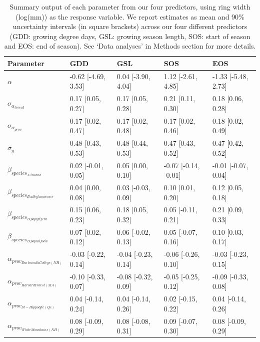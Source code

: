 \begin{table}[ht]
\centering
\caption{Summary output of each parameter from our four predictors, using ring width (log(mm)) as the response variable. We report estimates as mean and 90\% uncertainty intervals (in square brackets) across our four different predictors (GDD: growing degree days, GSL: growing season length, SOS: start of season and EOS: end of season). See `Data analyses' in Methods section for more details.} 
\label{tab:tab_all}
\begin{tabular}{lllll}
  \hline
Parameter & GDD & GSL & SOS & EOS \\ 
  \hline
$\alpha$ & -0.62 [-4.69, 3.53] & 0.04 [-3.90, 4.04] & 1.12 [-2.61, 4.85] & -1.33 [-5.48, 2.73] \\ 
  $\sigma_{\alpha_{treeid}}$ & 0.17 [0.05, 0.27] & 0.17 [0.05, 0.28] & 0.21 [0.11, 0.30] & 0.18 [0.06, 0.28] \\ 
  $\sigma_{\alpha_{prov}}$ & 0.17 [0.02, 0.47] & 0.17 [0.02, 0.48] & 0.17 [0.02, 0.46] & 0.18 [0.02, 0.49] \\ 
  $\sigma_{y}$ & 0.48 [0.43, 0.53] & 0.48 [0.44, 0.53] & 0.47 [0.43, 0.52] & 0.47 [0.42, 0.52] \\ 
  $\beta_{species_{A. incana}}$ & 0.02 [-0.01, 0.05] & 0.05 [0.00, 0.10] & -0.07 [-0.14, -0.01] & -0.01 [-0.07, 0.04] \\ 
  $\beta_{species_{B. alleghaniensis}}$ & 0.04 [0.00, 0.08] & 0.03 [-0.03, 0.09] & 0.10 [0.01, 0.20] & 0.12 [0.05, 0.18] \\ 
  $\beta_{species_{B. papyrifera}}$ & 0.15 [0.06, 0.23] & 0.18 [0.05, 0.32] & 0.05 [-0.11, 0.21] & 0.21 [0.09, 0.33] \\ 
  $\beta_{species_{B. populifolia}}$ & 0.07 [0.02, 0.12] & 0.06 [-0.02, 0.13] & 0.05 [-0.07, 0.16] & 0.10 [0.03, 0.17] \\ 
  $\alpha_{prov_{Dartmouth College (NH)}}$ & -0.03 [-0.22, 0.14] & -0.04 [-0.23, 0.14] & -0.06 [-0.26, 0.10] & -0.03 [-0.23, 0.15] \\ 
  $\alpha_{prov_{Harvard Forest (MA)}}$ & -0.10 [-0.33, 0.07] & -0.08 [-0.32, 0.09] & -0.05 [-0.25, 0.12] & -0.09 [-0.33, 0.08] \\ 
  $\alpha_{prov_{St-Hippolyte (Qc)}}$ & 0.04 [-0.14, 0.24] & 0.04 [-0.14, 0.26] & 0.02 [-0.15, 0.22] & 0.04 [-0.14, 0.26] \\ 
  $\alpha_{prov_{White Mountains (NH)}}$ & 0.08 [-0.09, 0.29] & 0.08 [-0.08, 0.31] & 0.09 [-0.07, 0.30] & 0.08 [-0.09, 0.29] \\ 

\end{tabular}
\end{table}
